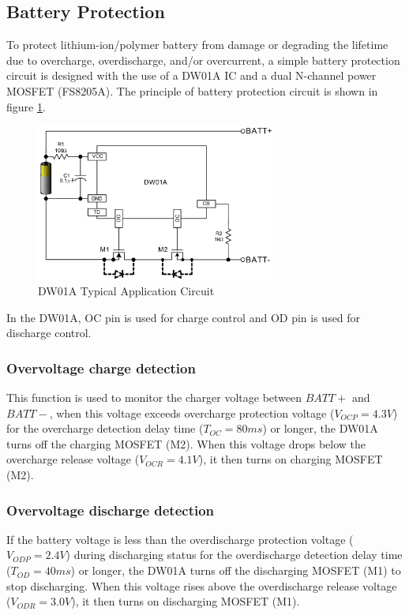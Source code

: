 \documentclass[\main/main.tex]{subfiles}
\begin{document}
\subsection{Battery Protection}
To protect lithium-ion/polymer battery from damage or degrading the lifetime due to overcharge, overdischarge, and/or overcurrent, a simple battery protection circuit is designed with the use of a DW01A IC and a dual N-channel power MOSFET (FS8205A). The principle of battery protection circuit is shown in figure \ref{fig:dw01a_typical_use}.
\begin{figure}[H]
    \begin{center}
        \includegraphics[width=0.7\textwidth]{dw01a_typical_use.png}
    \end{center}
    \caption{DW01A Typical Application Circuit}
    \label{fig:dw01a_typical_use}
\end{figure}
In the DW01A, OC pin is used for charge control and OD pin is used for discharge control.
\subsubsection{Overvoltage charge detection}
This function is used to monitor the charger voltage between $BATT+$ and $BATT-$, when this voltage exceeds overcharge protection voltage ($V_{OCP} = 4.3V$) for the overcharge detection delay time ($T_{OC} = 80ms$) or longer,  the DW01A turns off the charging MOSFET (M2). When this voltage drops below the overcharge release voltage ($V_{OCR} = 4.1V$), it then turns on charging MOSFET (M2).

\subsubsection{Overvoltage discharge detection}
If the battery voltage is less than the overdischarge protection voltage ($V_{ODP} = 2.4V$) during discharging status for the overdischarge detection delay time ($T_{OD} = 40ms$) or longer, the DW01A turns off the discharging MOSFET (M1) to stop discharging. When this voltage rises above the overdischarge release voltage ($V_{ODR} = 3.0V$), it then turns on discharging MOSFET (M1).
\end{document}

